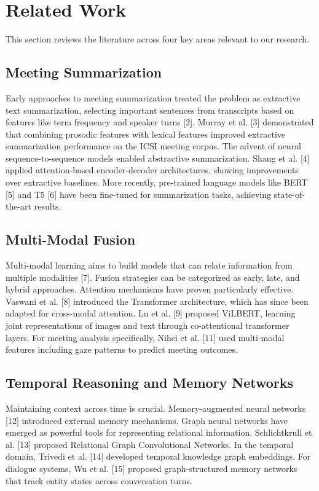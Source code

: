 \chapter{Related Work}
\noindent
This section reviews the literature across four key areas relevant to our research.

\section{Meeting Summarization}
Early approaches to meeting summarization treated the problem as extractive text summarization, selecting important sentences from transcripts based on features like term frequency and speaker turns [2]. Murray et al. [3] demonstrated that combining prosodic features with lexical features improved extractive summarization performance on the ICSI meeting corpus. The advent of neural sequence-to-sequence models enabled abstractive summarization. Shang et al. [4] applied attention-based encoder-decoder architectures, showing improvements over extractive baselines. More recently, pre-trained language models like BERT [5] and T5 [6] have been fine-tuned for summarization tasks, achieving state-of-the-art results.

\section{Multi-Modal Fusion}
Multi-modal learning aims to build models that can relate information from multiple modalities [7]. Fusion strategies can be categorized as early, late, and hybrid approaches. Attention mechanisms have proven particularly effective. Vaswani et al. [8] introduced the Transformer architecture, which has since been adapted for cross-modal attention. Lu et al. [9] proposed ViLBERT, learning joint representations of images and text through co-attentional transformer layers. For meeting analysis specifically, Nihei et al. [11] used multi-modal features including gaze patterns to predict meeting outcomes.

\section{Temporal Reasoning and Memory Networks}
Maintaining context across time is crucial. Memory-augmented neural networks [12] introduced external memory mechanisms. Graph neural networks have emerged as powerful tools for representing relational information. Schlichtkrull et al. [13] proposed Relational Graph Convolutional Networks. In the temporal domain, Trivedi et al. [14] developed temporal knowledge graph embeddings. For dialogue systems, Wu et al. [15] proposed graph-structured memory networks that track entity states across conversation turns.

